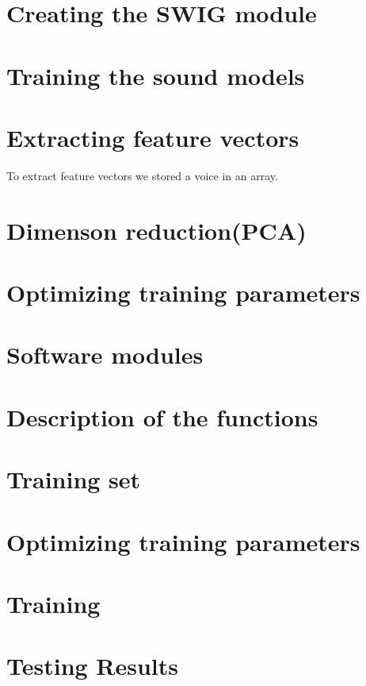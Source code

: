\documentclass[english,12pt,oneside,a4paper]{article}
\begin{document}
\begin{center}
		\section{Creating the SWIG module}
		
		\section{Training the sound models}
		
		\section{Extracting feature vectors}
		To extract feature vectors we stored a voice in an array.
		\section{Dimenson reduction(PCA)}
		
		\section{Optimizing training parameters}
		
		\section{Software modules}
		
		\section{Description of the functions}
		
		\section{Training set}
		
		\section{Optimizing training parameters}
		
		\section{Training}
		
		\section{Testing Results}
		

\end{center}
\end{document}
